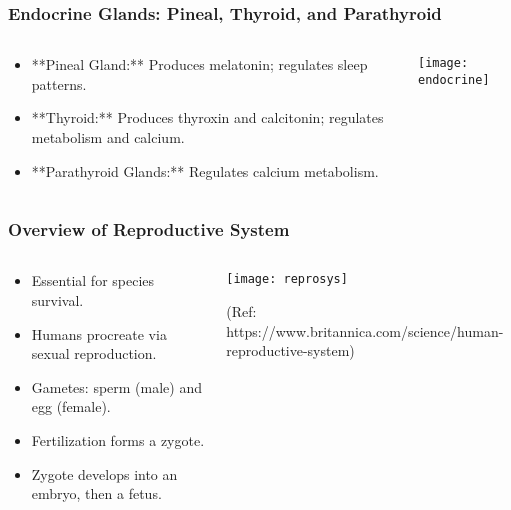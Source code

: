 \begin{frame}[fragile]\frametitle{Endocrine Glands: Pineal, Thyroid, and Parathyroid}
\begin{columns}
    \begin{column}[T]{0.5\linewidth}
      \begin{itemize}
		\item **Pineal Gland:** Produces melatonin; regulates sleep patterns.
		\item **Thyroid:** Produces thyroxin and calcitonin; regulates metabolism and calcium.
		\item **Parathyroid Glands:** Regulates calcium metabolism.
	  \end{itemize}
    \end{column}
    \begin{column}[T]{0.5\linewidth}
		\begin{center}
		\texttt{[image: endocrine]}
		\end{center}	
    \end{column}
  \end{columns}
\end{frame}

\begin{frame}[fragile]\frametitle{Overview of Reproductive System}
\begin{columns}
    \begin{column}[T]{0.5\linewidth}
      \begin{itemize}
		\item Essential for species survival.
		\item Humans procreate via sexual reproduction.
		\item Gametes: sperm (male) and egg (female).
		\item Fertilization forms a zygote.
		\item Zygote develops into an embryo, then a fetus.
	  \end{itemize}
    \end{column}
    \begin{column}[T]{0.5\linewidth}
		\begin{center}
		\texttt{[image: reprosys]}

		
		{\tiny (Ref: https://www.britannica.com/science/human-reproductive-system)}		
		\end{center}	
    \end{column}
  \end{columns}
\end{frame}

